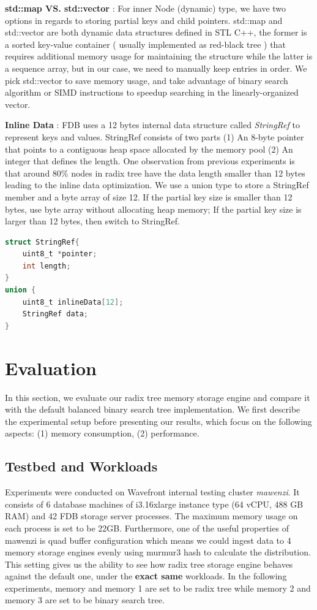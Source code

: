 \documentclass[sigplan,screen,nonacm]{acmart}
\begin{document}
\textbf {std::map VS. std::vector} : For inner Node (dynamic) type, we have two options in regards to storing partial keys and child pointers. std::map and std::vector are both dynamic data structures defined in STL C++, the former is a sorted key-value container ( usually implemented as red-black tree ) that requires additional memory usage for maintaining the structure while the latter is a sequence array, but in our case, we need to manually keep entries in order. We pick std::vector to save memory usage, and take advantage of binary search algorithm or SIMD instructions to speedup searching in the linearly-organized vector. 

\textbf {Inline Data} :  FDB uses a 12 bytes internal data structure called {\itshape StringRef} to represent keys and values. StringRef consists of two parts (1) An 8-byte pointer that points to a contiguous heap space allocated by the memory pool (2) An integer that defines the length. One observation from previous experiments is that around 80\% nodes in radix tree have the data length smaller than 12 bytes leading to the inline data optimization. We use a union type to store a StringRef member and a byte array of size 12. If the partial key size is smaller than 12 bytes, use byte array without allocating heap memory; If the partial key size is larger than 12 bytes, then switch to StringRef. 
\begin{lstlisting}[language=C, caption=Example inline data]
struct StringRef{
    uint8_t *pointer;
    int length;
}
union {
    uint8_t inlineData[12];
    StringRef data;
}
\end{lstlisting}

\section{Evaluation}
In this section, we evaluate our radix tree memory storage engine and compare it with the default balanced binary search tree implementation. We first describe the experimental setup before presenting our results, which focus on the following aspects: (1) memory consumption, (2) performance. 
 
\subsection{Testbed and Workloads}
Experiments were conducted on Wavefront internal testing cluster {\itshape mawenzi}. It consists of 6 database machines of i3.16xlarge instance type (64 vCPU, 488 GB RAM) and 42 FDB storage server processes. The maximum memory usage on each process is set to be 22GB. Furthermore, one of the useful properties of mawenzi is quad buffer configuration which means we could ingest data to 4 memory storage engines evenly using murmur3 hash to calculate the distribution. This setting gives us the ability to see how radix tree storage engine behaves against the default one, under the \textbf {exact same} workloads. In the following experiments, memory and memory 1 are set to be radix tree while memory 2 and memory 3 are set to be binary search tree. 
\end{document}
